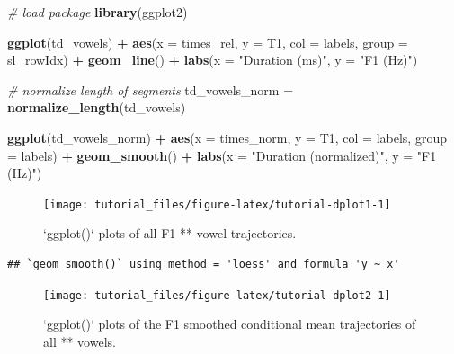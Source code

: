\documentclass[]{book}
\newenvironment{Shaded}{\begin{snugshade}}{\end{snugshade}}
\newcommand{\CommentTok}[1]{\textcolor[rgb]{0.56,0.35,0.01}{\textit{#1}}}
\newcommand{\DataTypeTok}[1]{\textcolor[rgb]{0.13,0.29,0.53}{#1}}
\newcommand{\KeywordTok}[1]{\textcolor[rgb]{0.13,0.29,0.53}{\textbf{#1}}}
\newcommand{\NormalTok}[1]{#1}
\newcommand{\OperatorTok}[1]{\textcolor[rgb]{0.81,0.36,0.00}{\textbf{#1}}}
\newcommand{\StringTok}[1]{\textcolor[rgb]{0.31,0.60,0.02}{#1}}
\begin{document}
\begin{Shaded}
\begin{Highlighting}[]
\CommentTok{# load package}
\KeywordTok{library}\NormalTok{(ggplot2)}

\KeywordTok{ggplot}\NormalTok{(td_vowels) }\OperatorTok{+}
\StringTok{  }\KeywordTok{aes}\NormalTok{(}\DataTypeTok{x =}\NormalTok{ times_rel, }\DataTypeTok{y =}\NormalTok{ T1, }\DataTypeTok{col =}\NormalTok{ labels, }\DataTypeTok{group =}\NormalTok{ sl_rowIdx) }\OperatorTok{+}
\StringTok{  }\KeywordTok{geom_line}\NormalTok{() }\OperatorTok{+}
\StringTok{  }\KeywordTok{labs}\NormalTok{(}\DataTypeTok{x =} \StringTok{"Duration (ms)"}\NormalTok{, }\DataTypeTok{y =} \StringTok{"F1 (Hz)"}\NormalTok{)}

\CommentTok{# normalize length of segments}
\NormalTok{td_vowels_norm =}\StringTok{ }\KeywordTok{normalize_length}\NormalTok{(td_vowels)}

\KeywordTok{ggplot}\NormalTok{(td_vowels_norm) }\OperatorTok{+}
\StringTok{  }\KeywordTok{aes}\NormalTok{(}\DataTypeTok{x =}\NormalTok{ times_norm, }\DataTypeTok{y =}\NormalTok{ T1, }\DataTypeTok{col =}\NormalTok{ labels, }\DataTypeTok{group =}\NormalTok{ labels) }\OperatorTok{+}
\StringTok{  }\KeywordTok{geom_smooth}\NormalTok{() }\OperatorTok{+}
\StringTok{  }\KeywordTok{labs}\NormalTok{(}\DataTypeTok{x =} \StringTok{"Duration (normalized)"}\NormalTok{, }\DataTypeTok{y =} \StringTok{"F1 (Hz)"}\NormalTok{) }
\end{Highlighting}
\end{Shaded}

\begin{figure}

{\centering \texttt{[image: tutorial\_files/figure-latex/tutorial-dplot1-1]} 

}

\caption{`ggplot()` plots of all F1 *\@* vowel trajectories.}\label{fig:tutorial-dplot1}
\end{figure}

\begin{verbatim}
## `geom_smooth()` using method = 'loess' and formula 'y ~ x'
\end{verbatim}

\begin{figure}

{\centering \texttt{[image: tutorial\_files/figure-latex/tutorial-dplot2-1]} 

}

\caption{`ggplot()` plots of the F1 smoothed conditional mean trajectories of all *\@* vowels.}\label{fig:tutorial-dplot2}
\end{figure}
\end{document}
